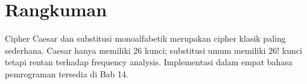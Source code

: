\section*{Rangkuman}
Cipher Caesar dan substitusi monoalfabetik merupakan cipher klasik paling sederhana. Caesar hanya memiliki 26 kunci; substitusi umum memiliki $26!$ kunci tetapi rentan terhadap frequency analysis. Implementasi dalam empat bahasa pemrograman tersedia di Bab 14.
